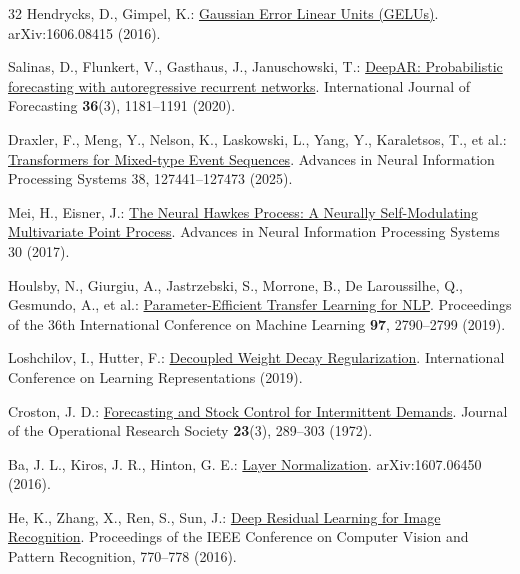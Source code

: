\documentclass[runningheads]{llncs}
\begin{document}
\begin{thebibliography}{32}
Hendrycks, D., Gimpel, K.: \href{https://arxiv.org/abs/1606.08415}{Gaussian Error Linear Units (GELUs)}. arXiv:1606.08415 (2016).

Salinas, D., Flunkert, V., Gasthaus, J., Januschowski, T.: \href{https://www.sciencedirect.com/science/article/pii/S0169207019301888}{DeepAR: Probabilistic forecasting with autoregressive recurrent networks}. International Journal of Forecasting \textbf{36}(3), 1181--1191 (2020). 

Draxler, F., Meng, Y., Nelson, K., Laskowski, L., Yang, Y., Karaletsos, T., et al.: \href{https://proceedings.nips.cc/paper_files/paper/2025/hash/a6c7515ac435277dc92b75a07bb2257c-Abstract-Conference.html}{Transformers for Mixed-type Event Sequences}. Advances in Neural Information Processing Systems 38, 127441--127473 (2025). 

Mei, H., Eisner, J.: \href{https://papers.nips.cc/paper_files/paper/2017/hash/6463c88460bd63bbe256e495c63aa40b-Abstract.html}{The Neural Hawkes Process: A Neurally Self-Modulating Multivariate Point Process}. Advances in Neural Information Processing Systems 30 (2017).

Houlsby, N., Giurgiu, A., Jastrzebski, S., Morrone, B., De Laroussilhe, Q., Gesmundo, A., et al.: \href{https://proceedings.mlr.press/v97/houlsby19a.html}{Parameter-Efficient Transfer Learning for NLP}. Proceedings of the 36th International Conference on Machine Learning \textbf{97}, 2790--2799 (2019).

Loshchilov, I., Hutter, F.: \href{https://openreview.net/forum?id=Bkg6RiCqY7}{Decoupled Weight Decay Regularization}. International Conference on Learning Representations (2019).

Croston, J. D.: \href{https://link.springer.com/article/10.1057/jors.1972.50}{Forecasting and Stock Control for Intermittent Demands}. Journal of the Operational Research Society \textbf{23}(3), 289--303 (1972). 

Ba, J. L., Kiros, J. R., Hinton, G. E.: \href{https://arxiv.org/abs/1607.06450}{Layer Normalization}. arXiv:1607.06450 (2016).

He, K., Zhang, X., Ren, S., Sun, J.: \href{https://openaccess.thecvf.com/content_cvpr_2016/html/He_Deep_Residual_Learning_CVPR_2016_paper.html}{Deep Residual Learning for Image Recognition}. Proceedings of the IEEE Conference on Computer Vision and Pattern Recognition, 770--778 (2016). 


\end{thebibliography}
\end{document}
